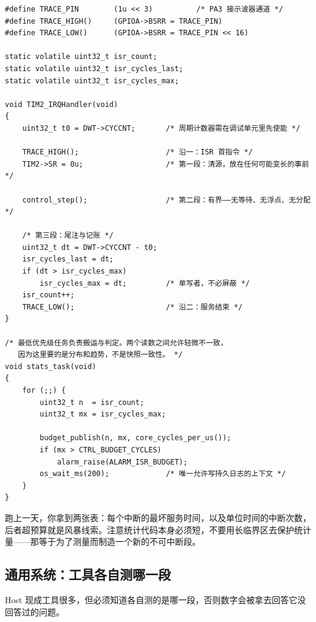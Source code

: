 \documentclass[12pt,a4paper,fontset=fandol]{ctexbook}
\newcommand{\Lang}[1]{\textsf{#1}}
\newcommand{\DomHost}{\Lang{Host}}
\begin{document}
\begin{lstlisting}[style=cstyle,caption={C：三段式最小 ISR——清源、有界处理、打点尾注（统计在最低优先级任务里做）},label={lst:ch03-isr}]
#define TRACE_PIN        (1u << 3)          /* PA3 接示波器通道 */
#define TRACE_HIGH()     (GPIOA->BSRR = TRACE_PIN)
#define TRACE_LOW()      (GPIOA->BSRR = TRACE_PIN << 16)

static volatile uint32_t isr_count;
static volatile uint32_t isr_cycles_last;
static volatile uint32_t isr_cycles_max;

void TIM2_IRQHandler(void)
{
    uint32_t t0 = DWT->CYCCNT;       /* 周期计数器需在调试单元里先使能 */

    TRACE_HIGH();                    /* 沿一：ISR 首指令 */
    TIM2->SR = 0u;                   /* 第一段：清源，放在任何可能变长的事前 */

    control_step();                  /* 第二段：有界——无等待、无浮点、无分配 */

    /* 第三段：尾注与记账 */
    uint32_t dt = DWT->CYCCNT - t0;
    isr_cycles_last = dt;
    if (dt > isr_cycles_max)
        isr_cycles_max = dt;         /* 单写者，不必屏蔽 */
    isr_count++;
    TRACE_LOW();                     /* 沿二：服务结束 */
}

/* 最低优先级任务负责搬运与判定。两个读数之间允许轻微不一致，
   因为这里要的是分布和趋势，不是快照一致性。 */
void stats_task(void)
{
    for (;;) {
        uint32_t n  = isr_count;
        uint32_t mx = isr_cycles_max;

        budget_publish(n, mx, core_cycles_per_us());
        if (mx > CTRL_BUDGET_CYCLES)
            alarm_raise(ALARM_ISR_BUDGET);
        os_wait_ms(200);             /* 唯一允许写持久日志的上下文 */
    }
}
\end{lstlisting}

跑上一天，你拿到两张表：每个中断的最坏服务时间，以及单位时间的中断次数，后者超预算就是风暴线索。注意统计代码本身必须短，不要用长临界区去保护统计量——那等于为了测量而制造一个新的不可中断段。

\subsection{通用系统：工具各自测哪一段}

\DomHost{} 现成工具很多，但必须知道各自测的是哪一段，否则数字会被拿去回答它没回答过的问题。
\end{document}
